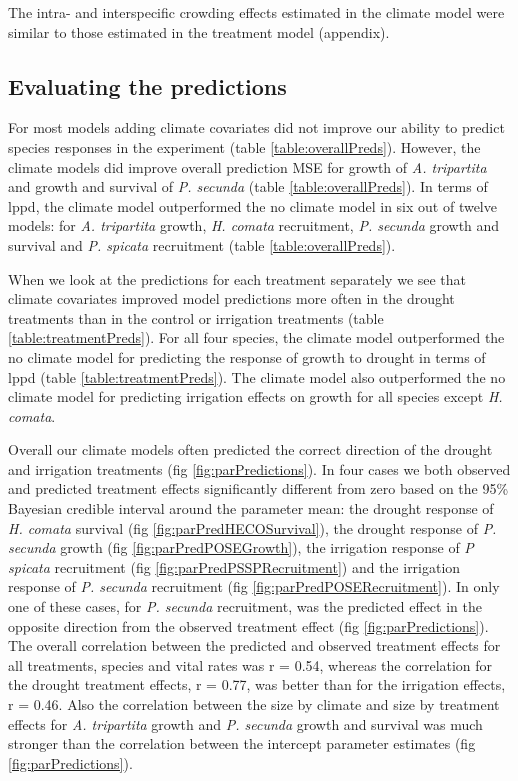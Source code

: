 \documentclass[11pt]{article}
\begin{document}
\begin{doublespace}
The intra- and interspecific crowding effects estimated in the climate model were similar to those estimated in the treatment model (appendix).

\subsection*{Evaluating the predictions}

For most models adding climate covariates did not improve our ability to predict species responses in the experiment (table \ref{table:overallPreds}). However, the climate models did improve overall prediction MSE for growth of \textit{A. tripartita} and growth and survival of \textit{P. secunda} (table \ref{table:overallPreds}). In terms of lppd, the climate model outperformed the no climate model in six out of twelve models: for \textit{A. tripartita} growth, \textit{H. comata} recruitment, \textit{P. secunda} growth and survival and \textit{P. spicata} recruitment (table \ref{table:overallPreds}).

When we look at the predictions for each treatment separately we see that climate covariates improved model predictions more often in the drought treatments than in the control or irrigation treatments (table \ref{table:treatmentPreds}). For all four species, the climate model outperformed the no climate model for predicting the response of growth to drought in terms of lppd (table \ref{table:treatmentPreds}). The climate model also outperformed the no climate model for predicting irrigation effects on growth for all species except \textit{H. comata}. 

Overall our climate models often predicted the correct direction of the drought and irrigation treatments (fig \ref{fig:parPredictions}). In four cases we both observed and predicted treatment effects significantly different from zero based on the 95\% Bayesian credible interval around the parameter mean: the drought response of \textit{H. comata} survival (fig \ref{fig:parPredHECOSurvival}), the drought response of \textit{P. secunda} growth (fig \ref{fig:parPredPOSEGrowth}), the irrigation response of \textit{P spicata} recruitment (fig \ref{fig:parPredPSSPRecruitment}) and the irrigation response of \textit{P. secunda} recruitment (fig \ref{fig:parPredPOSERecruitment}).  In only one of these cases, for \textit{P. secunda} recruitment, was the predicted effect in the opposite direction from the observed treatment effect (fig \ref{fig:parPredictions}). The overall correlation between the predicted and observed treatment effects for all treatments, species and vital rates was r = 0.54, whereas the correlation for the drought treatment effects, r = 0.77, was better than for the irrigation effects, r = 0.46.  Also the correlation between the size by climate and size by treatment effects for \textit{A. tripartita} growth and \textit{P. secunda} growth and survival was much stronger than the correlation between the intercept parameter estimates (fig \ref{fig:parPredictions}).  


\end{doublespace}
\end{document}
